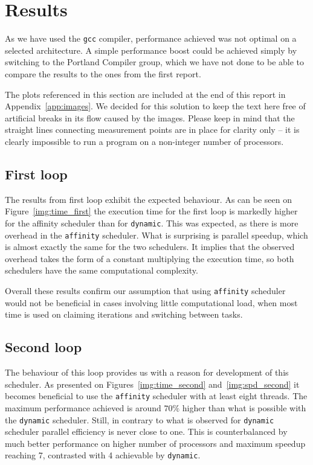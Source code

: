 \documentclass[11pt,a4paper]{article}
\begin{document}
\section{Results}
As we have used the \texttt{gcc} compiler, performance achieved was not optimal on a selected architecture.
A simple performance boost could be achieved simply by switching to the Portland Compiler group, which we have not done to be able to compare the results to the ones from the first report.

The plots referenced in this section are included at the end of this report in Appendix~\ref{app:images}.
We decided for this solution to keep the text here free of artificial breaks in its flow caused by the images.
Please keep in mind that the straight lines connecting measurement points are in place for clarity only -- it is clearly impossible to run a program on a non-integer number of processors.

\subsection{First loop}
The results from first loop exhibit the expected behaviour.
As can be seen on Figure~\ref{img:time_first} the execution time for the first loop is markedly higher for the affinity scheduler than for \texttt{dynamic}.
This was expected, as there is more overhead in the \texttt{affinity} scheduler.
What is surprising is parallel speedup, which is almost exactly the same for the two schedulers.
It implies that the observed overhead takes the form of a constant multiplying the execution time, so both schedulers have the same computational complexity.

Overall these results confirm our assumption that using \texttt{affinity} scheduler would not be beneficial in cases involving little computational load, when most time is used on claiming iterations and switching between tasks.

\subsection{Second loop}
The behaviour of this loop provides us with a reason for development of this scheduler.
As presented on Figures~\ref{img:time_second} and~\ref{img:spd_second} it becomes beneficial to use the \texttt{affinity} scheduler with at least eight threads.
The maximum performance achieved is around $70\%$ higher than what is possible with the \texttt{dynamic} scheduler.
Still, in contrary to what is observed for \texttt{dynamic} scheduler parallel efficiency is never close to one.
This is counterbalanced by much better performance on higher number of processors and maximum speedup reaching 7, contrasted with 4 achievable by \texttt{dynamic}.
\end{document}
